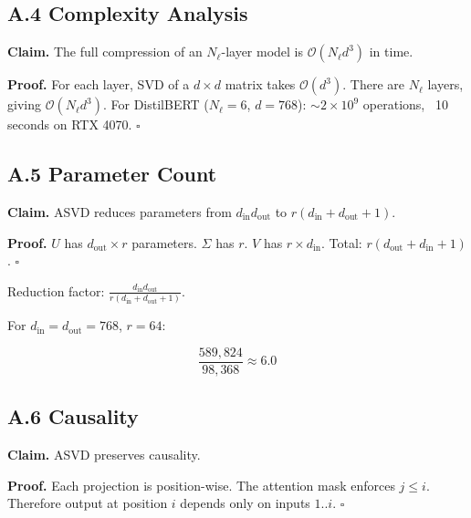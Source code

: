 \subsection{A.4 Complexity Analysis}

\textbf{Claim.} The full compression of an $N_\ell$-layer model is 
$\mathcal{O}(N_\ell d^3)$ in time.

\textbf{Proof.} For each layer, SVD of a $d \times d$ matrix takes 
$\mathcal{O}(d^3)$. There are $N_\ell$ layers, giving $\mathcal{O}(N_\ell d^3)$. 
For DistilBERT ($N_\ell = 6$, $d = 768$): $\sim 2 \times 10^9$ operations, 
~10 seconds on RTX 4070. $\square$

\subsection{A.5 Parameter Count}

\textbf{Claim.} ASVD reduces parameters from $d_\text{in} d_\text{out}$ to 
$r(d_\text{in} + d_\text{out} + 1)$.

\textbf{Proof.} $U$ has $d_\text{out} \times r$ parameters. $\Sigma$ has $r$. 
$V$ has $r \times d_\text{in}$. Total: $r(d_\text{out} + d_\text{in} + 1)$. $\square$

Reduction factor: $\frac{d_\text{in} d_\text{out}}{r(d_\text{in} + d_\text{out} + 1)}$.

For $d_\text{in} = d_\text{out} = 768$, $r = 64$:

\[
\frac{589,824}{98,368} \approx 6.0
\]

\subsection{A.6 Causality}

\textbf{Claim.} ASVD preserves causality.

\textbf{Proof.} Each projection is position-wise. The attention mask enforces 
$j \leq i$. Therefore output at position $i$ depends only on inputs 
$1..i$. $\square$

